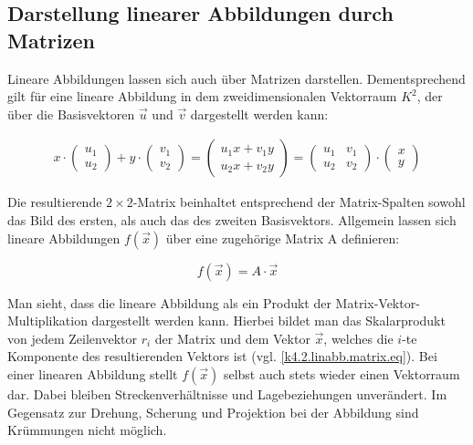 \documentclass[]{dsadokumentation}
\begin{document}
\subsection{Darstellung linearer Abbildungen durch Matrizen}
Lineare Abbildungen lassen sich auch über Matrizen darstellen. Dementsprechend gilt für eine lineare Abbildung in dem zweidimensionalen Vektorraum $K^2$, der über die Basisvektoren $\vec{u}$ und $\vec{v}$ dargestellt werden kann:

\begin{equation}
  \label{k4.2.linabb.matrix.eq}
  \begin{aligned}
    x \cdot \left(\begin{array}{c} u_1 \\ u_2 \end{array}\right) + y \cdot \left(\begin{array}{c} v_1 \\ v_2 \end{array}\right) = \left(\begin{array}{c} u_1 x + v_1 y \\ u_2 x + v_2 y \end{array}\right) = \left( \begin{array}{rr} u_1 & v_1 \\ u_2 & v_2 \end{array}\right) \cdot \left(\begin{array}{c} x \\ y \end{array}\right)
  \end{aligned}
\end{equation}

Die resultierende $2 \times 2$-Matrix beinhaltet entsprechend der Matrix-Spalten sowohl das Bild des ersten, als auch das des zweiten Basisvektors. Allgemein lassen sich lineare Abbildungen $f(\vec{x})$ über eine zugehörige Matrix A definieren:

\begin{equation}
  f(\vec{x}) = A \cdot \vec{x}
\end{equation}

Man sieht, dass die lineare Abbildung als ein Produkt der Matrix-Vektor-Multiplikation dargestellt werden kann. Hierbei bildet man das Skalarprodukt von jedem Zeilenvektor $r_i$ der Matrix und dem Vektor $\vec{x}$, welches die $i$-te Komponente des resultierenden Vektors ist (vgl. \cref{k4.2.linabb.matrix.eq}). Bei einer linearen Abbildung stellt $f(\vec{x})$ selbst auch stets wieder einen Vektorraum dar. Dabei bleiben Streckenverhältnisse und Lagebeziehungen unverändert. Im Gegensatz zur Drehung, Scherung und Projektion bei der Abbildung sind Krümmungen nicht möglich.
\end{document}
